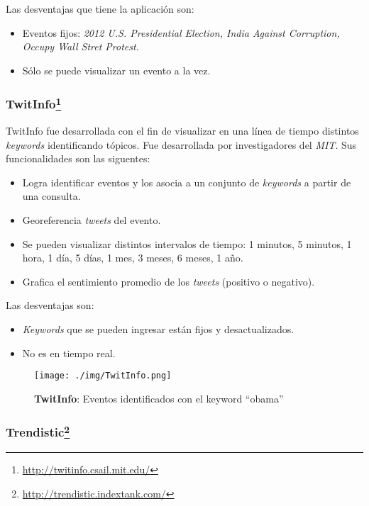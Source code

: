 \documentclass[10pt]{article}
\begin{document}
Las desventajas que tiene la aplicación son:

\begin{itemize}
	\item Eventos fijos: \emph{2012 U.S. Presidential Election, India Against Corruption, Occupy Wall Stret Protest.}
	\item Sólo se puede visualizar un evento a la vez.
\end{itemize}

\subsubsection*{TwitInfo\footnote{\url{http://twitinfo.csail.mit.edu/}}}
TwitInfo\cite{twitinfo} fue desarrollada con el fin de visualizar en una línea de tiempo distintos \emph{keywords} identificando tópicos. Fue desarrollada por investigadores del \emph{MIT}. Sus funcionalidades son las siguentes:

\begin{itemize}
	\item Logra identificar eventos y los asocia a un conjunto de \emph{keywords} a partir de una consulta.
	\item Georeferencia \emph{tweets} del evento.
	\item Se pueden visualizar distintos intervalos de tiempo: 1 minutos, 5 minutos, 1 hora, 1 día, 5 días, 1 mes, 3 meses, 6 meses, 1 año.
	\item Grafica el sentimiento promedio de los \emph{tweets} (positivo o negativo).
\end{itemize}

Las desventajas son:

\begin{itemize}
	\item \emph{Keywords} que se pueden ingresar están fijos y desactualizados.
	\item No es en tiempo real.
\end{itemize}

\begin{figure}[h!]
	\centering
    \texttt{[image: ./img/TwitInfo.png]}
	\caption{\textbf{TwitInfo}: Eventos identificados con el keyword ``obama''}
	\label{twitinfo}
\end{figure}

\subsubsection*{Trendistic\footnote{\url{http://trendistic.indextank.com/}}}
\end{document}

